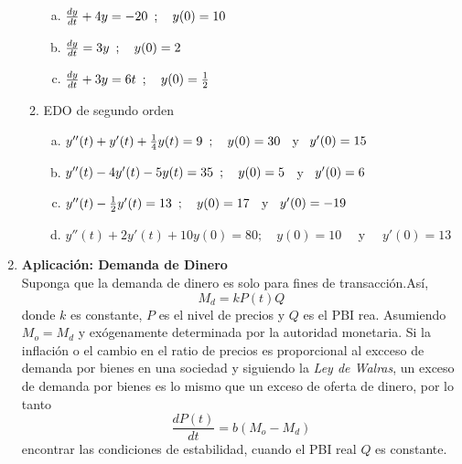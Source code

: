 \documentclass[10pt,a4paper]{article}
\begin{document}
\begin{enumerate}
\begin{enumerate}[2.1]
\begin{enumerate}[a)]
							\item $\frac{dy}{dt}+4y=-20\enskip; \quad y(0)=10$
							\item $\frac{dy}{dt}=3y\enskip; \quad y(0)=2$
							\item $\frac{dy}{dt}+3y=6t\enskip; \quad y(0)=\frac{1}{2}$
						\end{enumerate}
					\item EDO de segundo orden
						\begin{enumerate}[a)]
							\item $y''(t)+y'(t)+\frac{1}{4}y(t)=9 \enskip;\quad y(0)=30\enskip$ y $\enskip y'(0)=15$
							\item $y''(t)-4y'(t)-5y(t)=35\enskip;\quad y(0)=5\enskip$ y $\enskip y'(0)=6$
							\item $y''(t)-\frac{1}{2}y'(t)=13\enskip;\quad y(0)=17\enskip$ y $\enskip y'(0)=-19$
							\item $y''(t)+2y'(t)+10y(0)=80;\quad y(0)=10\quad$ y $\quad y'(0)=13$
						\end{enumerate}
				\end{enumerate}
		\item \textbf{Aplicación: Demanda de Dinero}\\
		 Suponga que la demanda de dinero es solo para fines de transacción.Así, $$M_d = kP(t)Q$$ donde $k$ es constante, $P$ es el nivel de precios y $Q$ es el PBI rea. Asumiendo $M_o=M_d$ y exógenamente determinada por la autoridad monetaria. Si la inflación o el cambio en el ratio de precios es proporcional al excceso de demanda por bienes en una sociedad y siguiendo la \textit{Ley de Walras}, un exceso de demanda por bienes es lo mismo que un exceso de oferta de dinero, por lo tanto $$\frac{dP(t)}{dt}=b(M_o-M_d)$$ encontrar las condiciones de estabilidad, cuando el PBI real $Q$ es constante.
	\end{enumerate}
\end{document}
